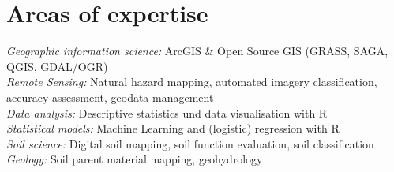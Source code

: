 \documentclass[a4paper]{twentysecondcv} %
\begin{document}

\aboutme{} %







\makeprofile %




\section{Areas of expertise}

\emph{Geographic information science:} ArcGIS \& Open Source GIS (GRASS, SAGA, \hspace*{14.5em} QGIS, GDAL/OGR)\\[0.3em]
\emph{Remote Sensing:} Natural hazard mapping, automated imagery classification, \\
\hspace*{7.5em} accuracy assessment, geodata management \\[0.3em]
\emph{Data analysis:} Descriptive statistics und data visualisation with R\\[0.3em]
\emph{Statistical models:} Machine Learning and (logistic) regression with R\\[0.3em]
\emph{Soil science:} Digital soil mapping, soil function evaluation,  soil classification\\[0.3em]
\emph{Geology:} Soil parent material mapping, geohydrology\\[0.3em]
\end{document}
